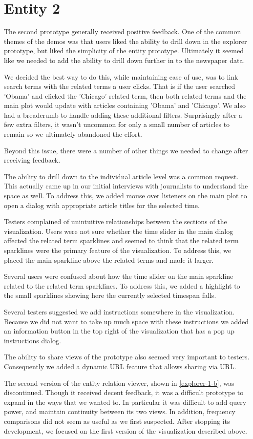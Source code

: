 \section{Entity 2}
The second prototype generally received positive feedback. One of the common themes of the demos was that users liked the ability to drill down in the explorer prototype, but liked the simplicity of the entity prototype. Ultimately it seemed like we needed to add the ability to drill down further in to the newspaper data.

We decided the best way to do this, while maintaining ease of use, was to link search terms with the related terms a user clicks. That is if the user searched 'Obama' and clicked the 'Chicago' related term, then both related terms and the main plot would update with articles containing 'Obama' and 'Chicago'. We also had a breadcrumb to handle adding these additional filters. Surprisingly after a few extra filters, it wasn't uncommon for only a small number of articles to remain so we ultimately abandoned the effort.

Beyond this issue, there were a number of other things we needed to change after receiving feedback.

The ability to drill down to the individual article level was a common request. This actually came up in our initial interviews with journalists to understand the space as well. To address this, we added mouse over listeners on the main plot to open a dialog with appropriate article titles for the selected time.

Testers complained of unintuitive relationships between the sections of the visualization. Users were not sure whether the time slider in the main dialog affected the related term sparklines and seemed to think that the related term sparklines were the primary feature of the visualization. To address this, we placed the main sparkline above the related terms and made it larger.

Several users were confused about how the time slider on the main sparkline related to the related term sparklines. To address this, we added a highlight to the small sparklines showing here the currently selected timespan falls. 

Several testers suggested we add instructions somewhere in the visualization. Because we did not want to take up much space with these instructions we added an information button in the top right of the visualization that has a pop up instructions dialog.

The ability to share views of the prototype also seemed very important to testers. Consequently we added a dynamic URL feature that allows sharing via URL.

The second version of the entity relation viewer, shown in \ref{explorer-1-b}, was discontinued. Though it received decent feedback, it was a difficult prototype to expand in the ways that we wanted to. In particular it was difficult to add query power, and maintain continuity between its two views. In addition, frequency comparisons did not seem as useful as we first suspected. After stopping its development, we focused on the first version of the visualization described above.
